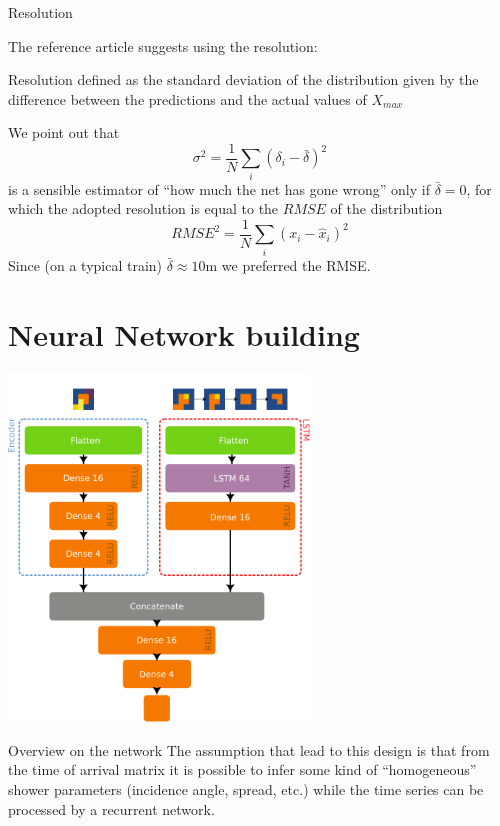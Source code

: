 \documentclass{beamer}
\begin{document}
\begin{frame}{Resolution}

    The reference article suggests using the resolution:
    \begin{block}{Resolution}
        defined as the standard deviation of the distribution given by the difference between the predictions and the actual values of $X_{max}$
    \end{block}

    We point out that 
    \[\sigma^2 = \frac{1}{N}\sum_i (\delta_i - \bar{\delta})^2\]
    is a sensible estimator of ``how much the net has gone wrong'' only if $\bar{\delta} = 0$, for which the adopted resolution is equal 
    to the $RMSE$ of the distribution
    \[ RMSE^2 = \frac{1}{N}\sum_i(x_i - \hat{x}_i)^2 \]
    Since (on a typical train) $\bar{\delta} \approx 10$m we preferred the RMSE.
\end{frame}



\section{Neural Network building}

    \centering
    \includegraphics[width=0.6\textwidth]{figures/model.pdf}
\begin{frame}{Overview on the network}
    The assumption that lead to this design is that from the time of arrival matrix
    it is possible to infer some kind of ``homogeneous'' shower parameters (incidence angle, spread, etc.)
    while the time series can be processed by a recurrent network.
\end{frame}
\end{document}
